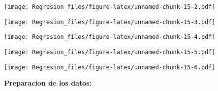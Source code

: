 \documentclass[]{article}
\newenvironment{Shaded}{\begin{snugshade}}{\end{snugshade}}
\newcommand{\DataTypeTok}[1]{\textcolor[rgb]{0.13,0.29,0.53}{#1}}
\newcommand{\KeywordTok}[1]{\textcolor[rgb]{0.13,0.29,0.53}{\textbf{#1}}}
\newcommand{\NormalTok}[1]{#1}
\newcommand{\OperatorTok}[1]{\textcolor[rgb]{0.81,0.36,0.00}{\textbf{#1}}}
\newcommand{\StringTok}[1]{\textcolor[rgb]{0.31,0.60,0.02}{#1}}
\begin{document}
\texttt{[image: Regresion\_files/figure-latex/unnamed-chunk-15-2.pdf]}

\begin{Shaded}
\end{Shaded}

\texttt{[image: Regresion\_files/figure-latex/unnamed-chunk-15-3.pdf]}

\begin{Shaded}
\end{Shaded}

\texttt{[image: Regresion\_files/figure-latex/unnamed-chunk-15-4.pdf]}

\begin{Shaded}
\end{Shaded}

\texttt{[image: Regresion\_files/figure-latex/unnamed-chunk-15-5.pdf]}

\begin{Shaded}
\end{Shaded}

\texttt{[image: Regresion\_files/figure-latex/unnamed-chunk-15-6.pdf]}

\textbf{Preparacion de los datos:}
\end{document}
